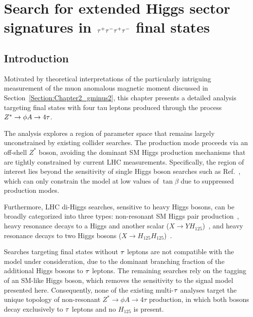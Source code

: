 \chapter{\texorpdfstring{Search for extended Higgs sector signatures in $\tau^+\tau^-\tau^+\tau^-$ final states}{Search for extended Higgs sector signatures in tautautautau final states}}
\thispagestyle{plain}  %
\pagestyle{chapterpages}
\label{Section:Chapter_4tau}
\minitoc

\section{Introduction}

Motivated by theoretical interpretations of the particularly intriguing measurement of the muon anomalous magnetic moment discussed in Section~\ref{Section:Chapter2_gminus2}, this chapter presents a detailed analysis targeting final states with four tau leptons produced through the process $Z^*\rightarrow\phi A\rightarrow4\tau$.

The analysis explores a region of parameter space that remains largely unconstrained by existing collider searches. The production mode proceeds via an off-shell $Z^*$ boson, avoiding the dominant \ac{SM} Higgs production mechanisms that are tightly constrained by current \ac{LHC} measurements. Specifically, the region of interest lies beyond the sensitivity of single Higgs boson searches such as Ref.~\cite{CMS:2022goy}, which can only constrain the model at low values of $\tan \beta$ due to suppressed production modes.  

Furthermore, LHC di-Higgs searches, sensitive to heavy Higgs bosons, can be broadly categorized into three types: non-resonant \ac{SM} Higgs pair production~\cite{CMS:2022hgz,CMS:2020tkr}, heavy resonance decays to a Higgs and another scalar ($X \to YH_{125}$)~\cite{CMS:2021yci,CMS:2023boe}, and heavy resonance decays to two Higgs bosons ($X \to H_{125}H_{125}$)~\cite{CMS:2022kdx,CMS:2021roc,CMS:2024rgy}.  

Searches targeting final states without $\tau$ leptons are not compatible with the model under consideration, due to the dominant branching fraction of the additional Higgs bosons to $\tau$ leptons. The remaining searches rely on the tagging of an SM-like Higgs boson, which removes the sensitivity to the signal model presented here. 
Consequently, none of the existing multi-$\tau$ analyses target the unique topology of non-resonant $Z^{*} \to \phi A \to 4\tau$ production, 
in which both bosons decay exclusively to $\tau$ leptons and no $H_{125}$ is present.  

